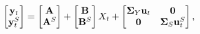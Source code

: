 \begin{equation} \label{eq:nYaffineYS}
	\begin{bmatrix}
		\mathbf{y}_{t} \\ 
		\mathbf{y}_{t}^{S}
	\end{bmatrix} 
	= 
	\begin{bmatrix}
		\mathbf{A} \\
		\mathbf{A}^{S}
	\end{bmatrix} 
	+
	\begin{bmatrix}
		\mathbf{B} \\
		\mathbf{B}^{S}  
	\end{bmatrix} 
	X_{t}
	+
	\begin{bmatrix}
		\mathbf{\mathbf{\Sigma}}_{Y} \mathbf{u}_{t} & \mathbf{0} \\
		\mathbf{0}     & \mathbf{\mathbf{\Sigma}}_{S} \mathbf{u}_{t}^{S}
	\end{bmatrix} ,
\end{equation}

